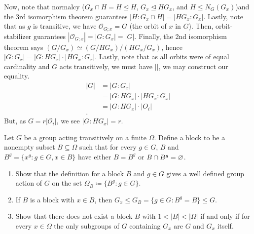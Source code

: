 \documentclass[a4paper]{article}
\begin{document}
\begin{solution}
\begin{enumerate}
	Now, note that normalcy (\(G_{x} \cap H  = H \trianglelefteq H\), \(G_{x} \trianglelefteq HG_{x}\), and \(H \le N_{G}\left( G_{x} \right) \))and the 3rd isomorphism theorem guarantees \(\left| H : G_{x} \cap H \right|  = \left| HG_{x} : G_{x} \right| \). Lastly, note that as \(g\) is transitive, we have \(\mathscr{O}_{G;x} = G\) (the orbit of \(x\) in \(G\)). Then, orbit-stabilizer guarantees \(\left| \mathscr{O}_{G;x} \right| = \left| G : G_{x} \right| = \left| G \right|  \). Finally, the 2nd isomorphism theorem says \((G / G_{x}) \simeq \left( G / HG_{x} \right) / \left( HG_{x} / G_{x} \right) \), hence \(\left| G : G_{x} \right|  = \left| G : HG_{x} \right| \cdot \left|  HG_{x} : G_{x} \right| \). Lastly, note that as all orbits were of equal cardinality and \(G\) acts transitively, we must have \(\left|  \right| \), we may construct our equality.\\
\begin{align*}
	\left| G \right| &= \left| G : G_{x} \right|  \\
			 &= \left| G : HG_{x}\right| \cdot \left|  HG_{x}  : G_{x}\right|  \\
			 &=  \left| G : HG_{x} \right| \cdot \left| O_{i} \right|  \\
.\end{align*}
But, as \(G = r \left| \mathscr{O}_{i} \right| \), we see \(\left| G:HG_{x} \right| = r\).


\end{enumerate}

\end{solution}
\newpage
\begin{problem}[5]
	Let \(G\) be a group acting transitively on a finite \(\Omega\). Define a block to be a nonempty subset \(B \subseteq \Omega\) such that for every \(g \in G\), \(B\) and \(B^{g} = \{x ^{g} : g \in G, x \in B\} \) have either \(B = B^{g}\) or \(B \cap B^{g} = \varnothing\).
	\begin{enumerate}
		\item Show that the definition for a block \(B\) and \(g \in G\) gives a well defined group action of \(G\) on the set \(\Omega_{B} \coloneqq \{B^{g} : g \in G\} \).
			\item If \(B\) is a block with \(x \in B\), then \(G_{x} \le G_{B} = \{g \in G : B^{g} = B\} \le G \).
				\item Show that there does not exist a block \(B\) with \(1 < \left| B \right|  < \left| \Omega \right| \) if and only if for every \(x \in \Omega\) the only subgroups of \(G\) containing \(G_{x}\) are \(G\) and \(G_{x}\) itself.
	\end{enumerate}
\end{problem}
\end{document}
